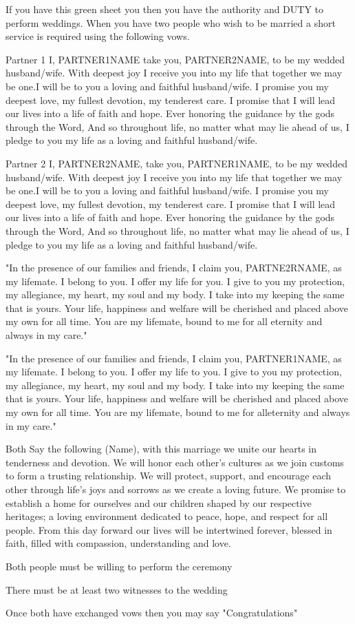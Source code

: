 \documentclass[green]{guildcamp3}
\begin{document}
	
	\name{\gWedding{}}
		
	If you have this green sheet you then you have the authority and DUTY to perform weddings. When you have two people who wish to be married a short service is required using the following vows. 
	
	Partner 1
	I, PARTNER1NAME take you, PARTNER2NAME, to be my wedded husband/wife. With deepest joy I receive you into my life that together we may be one.I will be to you a loving and faithful husband/wife. I promise you my deepest love, my fullest devotion, my tenderest care. I promise that I will lead our lives into a life of faith and hope. Ever honoring the guidance by the gods through the Word, And so throughout life, no matter what may lie ahead of us, I pledge to you my life as a loving and faithful husband/wife.
	
	Partner 2
	I, PARTNER2NAME, take you, PARTNER1NAME, to be my wedded husband/wife. With deepest joy I receive you into my life that together we may be one.I will be to you a loving and faithful husband/wife. I promise you my deepest love, my fullest devotion, my tenderest care. I promise that I will lead our lives into a life of faith and hope. Ever honoring the guidance by the gods through the Word, And so throughout life, no matter what may lie ahead of us, I pledge to you my life as a loving and faithful husband/wife.
	
	
	"In the presence of our families and friends, I claim you, PARTNE2RNAME, as my lifemate. I belong to you. I offer my life for you. I give to you my protection, my allegiance, my heart, my soul and my body. I take into my keeping the same that is yours. Your life, happiness and welfare will be cherished and placed above my own for all time. You are my lifemate, bound to me for all eternity and always in my care."
	
	"In the presence of our families and friends, I claim you, PARTNER1NAME, as my lifemate. I belong to you. I offer my life to you. I give to you my protection, my allegiance, my heart, my soul and my body. I take into my keeping the same that is yours. Your life, happiness and welfare will be cherished and placed above my own for all time. You are my lifemate, bound to me for alleternity and always in my care."
	
	Both Say the following
	(Name), with this marriage we unite our hearts in tenderness and devotion. We will honor each other's cultures as we join customs to form a trusting relationship. We will protect, support, and encourage each other through life's joys and sorrows as we create a loving future. We promise to establish a home for ourselves and our children shaped by our respective heritages; a loving environment dedicated to peace, hope, and respect for all people. From this day forward our lives will be intertwined forever, blessed in faith, filled with compassion, understanding and love.
	
	
	
	
	\begin{enum}[Directions]
		\item Both people must be willing to perform the ceremony
		\item There must be at least two witnesses to the wedding 
		\item Once both have exchanged vows then you may say "Congratulations"

	\end{enum}
	
	
\end{document}
